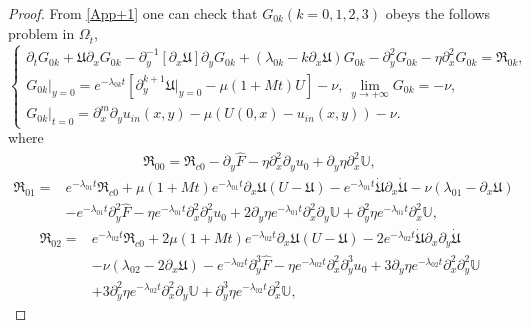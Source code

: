 \documentclass{amsart}
\numberwithin{equation}{section}
\begin{document}
\begin{proof}
From \eqref{App+1} one can check that $G_{0k}(k=0,1,2,3)$ obeys the follows problem in $\Omega_{\hat{t}}$,
\begin{equation*}
\begin{cases}
\partial_{t}G_{0k}
+\mathfrak{U}\partial_{x}G_{0k}
-\partial_{y}^{-1}[\partial_{x}\mathfrak{U}]\partial_{y}G_{0k}
+(\lambda_{0k}-k\partial_{x}\mathfrak{U})G_{0k}
-\partial_{y}^{2}G_{0k}
-\eta\partial_{x}^{2}G_{0k}
=\mathfrak{R}_{0k},\\
G_{0k}|_{y=0}=e^{-\lambda_{0k}t}\left[\partial_{y}^{k+1}\mathfrak{U}|_{y=0}-\mu(1+Mt)U\right]-\nu,~
\lim\limits_{y\to+\infty}G_{0k}=-\nu,\\
G_{0k}|_{t=0}=\partial_{x}^{m}\partial_{y}u_{in}(x,y)-\mu(U(0,x)-u_{in}(x,y))-\nu.
\end{cases}
\end{equation*}
where
\begin{align*}
\mathfrak{R}_{00}
=\mathfrak{R}_{c0}
  -\partial_{y}\hat{F}
  -\eta\partial_{x}^{2}\partial_{y}u_{0}
  +\partial_{y}\eta\partial_{x}^{2}\mathbb{U},
\end{align*}
\begin{align*}
\mathfrak{R}_{01}
=& e^{-\lambda_{01}t}\mathfrak{R}_{c0}
  +\mu(1+Mt)e^{-\lambda_{01}t}\partial_{x}\mathfrak{U}(U-\mathfrak{U})
  -e^{-\lambda_{01}t}\dot{\mathfrak{U}}\partial_{x}\dot{\mathfrak{U}}
  -\nu(\lambda_{01}-\partial_{x}\mathfrak{U})\\
 &-e^{-\lambda_{01}t}\partial_{y}^{2}\hat{F}
  -\eta e^{-\lambda_{01}t}\partial_{x}^{2}\partial_{y}^{2}u_{0}
  +2\partial_{y}\eta e^{-\lambda_{01}t}\partial_{x}^{2}\partial_{y}\mathbb{U}
  +\partial_{y}^{2}\eta e^{-\lambda_{01}t}\partial_{x}^{2}\mathbb{U},
\end{align*}
\begin{align*}
\mathfrak{R}_{02}
=& e^{-\lambda_{02}t}\mathfrak{R}_{c0}
  +2\mu(1+Mt)e^{-\lambda_{02}t}\partial_{x}\mathfrak{U}(U-\mathfrak{U})
  -2e^{-\lambda_{02}t}\dot{\mathfrak{U}}\partial_{x}\partial_{y}\dot{\mathfrak{U}}\\
 &-\nu(\lambda_{02}-2\partial_{x}\mathfrak{U})
  -e^{-\lambda_{02}t}\partial_{y}^{3}\hat{F}
  -\eta e^{-\lambda_{02}t}\partial_{x}^{2}\partial_{y}^{3}u_{0}
  +3\partial_{y}\eta e^{-\lambda_{02}t}\partial_{x}^{2}\partial_{y}^{2}\mathbb{U}\\
 &+3\partial_{y}^{2}\eta e^{-\lambda_{02}t}\partial_{x}^{2}\partial_{y}\mathbb{U}
  +\partial_{y}^{3}\eta e^{-\lambda_{02}t}\partial_{x}^{2}\mathbb{U},
\end{align*}

\end{proof}
\end{document}
